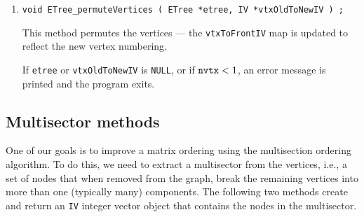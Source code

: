 \begin{enumerate}
\item
\begin{verbatim}
void ETree_permuteVertices ( ETree *etree, IV *vtxOldToNewIV ) ;
\end{verbatim}
This method permutes the vertices --- the {\tt vtxToFrontIV} map is
updated to reflect the new vertex numbering.
\par {}
If {\tt etree} or {\tt vtxOldToNewIV} is {\tt NULL},
or if ${\tt nvtx} < 1$,
an error message is printed and the program exits.
\end{enumerate}
\par
\subsection{Multisector methods}
\label{subsection:ETree:proto:multisector}
One of our goals is to improve a matrix ordering using the
multisection ordering algorithm.
To do this, we need to extract a multisector from the vertices,
i.e., a set of nodes that when removed from the graph, break the
remaining vertices into more than one (typically many) components.
The following two methods create and return an {\tt IV} integer
vector object that contains the nodes in the multisector.
\par
